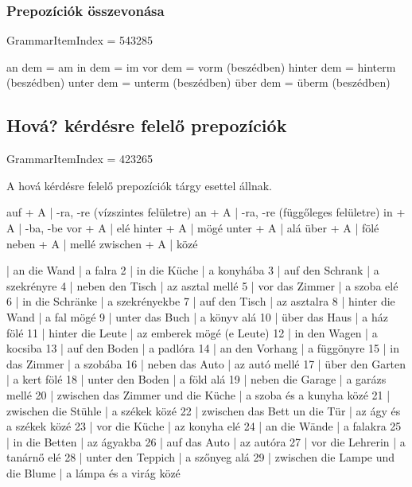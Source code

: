 \documentclass{article}
\newenvironment{desc}{\verbatim}{\endverbatim}
\newenvironment{exmp}{\verbatim}{\endverbatim}
\begin{document}
\subsubsection{Prepozíciók összevonása}

GrammarItemIndex = 543285

\begin{desc}
an dem = am
in dem = im
vor dem = vorm (beszédben)
hinter dem = hinterm (beszédben)
unter dem = unterm (beszédben)
über dem = überm (beszédben)
\end{desc}

\begin{exmp}
\end{exmp}

\subsection{Hová? kérdésre felelő prepozíciók}

GrammarItemIndex = 423265

\begin{desc}
A hová kérdésre felelő prepozíciók tárgy esettel állnak.

auf + A      | -ra, -re (vízszintes felületre)
an + A       | -ra, -re (függőleges felületre)
in + A       | -ba, -be
vor + A      | elé
hinter + A   | mögé
unter + A    | alá
über + A     | fölé
neben + A    | mellé
zwischen + A | közé
\end{desc}

\begin{exmp}
1 | an die Wand | a falra
2 | in die Küche | a konyhába
3 | auf den Schrank | a szekrényre
4 | neben den Tisch | az asztal mellé
5 | vor das Zimmer | a szoba elé
6 | in die Schränke | a szekrényekbe
7 | auf den Tisch | az asztalra
8 | hinter die Wand | a fal mögé
9 | unter das Buch | a könyv alá
10 | über das Haus | a ház fölé
11 | hinter die Leute | az emberek mögé (e Leute)
12 | in den Wagen | a kocsiba
13 | auf den Boden | a padlóra
14 | an den Vorhang | a függönyre
15 | in das Zimmer | a szobába
16 | neben das Auto | az autó mellé
17 | über den Garten | a kert fölé
18 | unter den Boden | a föld alá
19 | neben die Garage | a garázs mellé
20 | zwischen das Zimmer und die Küche | a szoba és a kunyha közé
21 | zwischen die Stühle | a székek közé
22 | zwischen das Bett un die Tür | az ágy és a székek közé
23 | vor die Küche | az konyha elé
24 | an die Wände | a falakra
25 | in die Betten | az ágyakba
26 | auf das Auto | az autóra
27 | vor die Lehrerin | a tanárnő elé
28 | unter den Teppich | a szőnyeg alá
29 | zwischen die Lampe und die Blume | a lámpa és a virág közé
\end{exmp}
\end{document}
